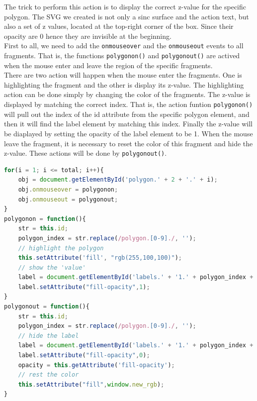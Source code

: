 \documentclass[paper=a4, fontsize=11pt]{report}
\begin{document}
The trick to perform this action is to display the correct z-value for the specific polygon. The SVG we created is not only a sinc surface and the action text, but also a set of z values, located at the top-right corner of the box. Since their opacity are 0 hence they are invisible at the beginning.\\

First to all, we need to add the \texttt{onmouseover} and the \texttt{onmouseout} events to all fragments. That is, the functions \texttt{polygonon()} and \texttt{polygonout()} are actived when the mouse enter and leave the region of the specific fragments.\\

There are two action will happen when the mouse enter the fragments. One is highlighting the fragment and the other is display its z-value. The highlighting action can be done simply by changing the color of the fragments. The z-value is displayed by matching the correct index. That is, the action funtion \texttt{polygonon()} will pull out the index of the id attribute from the specific polygon element, and then it will find the label element by matching this index. Finally the z-value will be diaplayed by setting the opacity of the label element to be 1. When the mouse leave the fragment, it is necessary to reset the color of this fragment and hide the z-value. These actions will be done by \texttt{polygonout()}.

\begin{lstlisting}[language = JavaScript]
for(i = 1; i <= total; i++){
    obj = document.getElementById('polygon.' + 2 + '.' + i);
    obj.onmouseover = polygonon;
    obj.onmouseout = polygonout;
}
polygonon = function(){
    str = this.id;
    polygon_index = str.replace(/polygon.[0-9]./, '');
    // highlight the polygon
    this.setAttribute('fill', "rgb(255,100,100)");
    // show the 'value'
    label = document.getElementById('labels.' + '1.' + polygon_index + '.text');
    label.setAttribute("fill-opacity",1);
}
polygonout = function(){
    str = this.id;
    polygon_index = str.replace(/polygon.[0-9]./, '');
    // hide the label
    label = document.getElementById('labels.' + '1.' + polygon_index + '.text');
    label.setAttribute("fill-opacity",0);
    opacity = this.getAttribute('fill-opacity');
    // rest the color
    this.setAttribute("fill",window.new_rgb);
}
\end{lstlisting}
\end{document}
